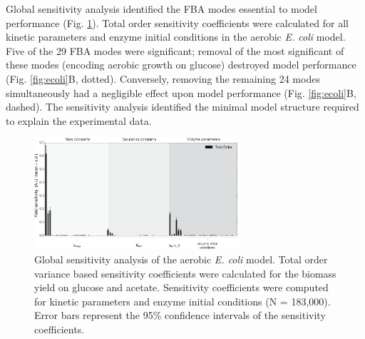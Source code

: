 \documentclass[10pt,twocolumn,twoside,final]{IEEEtran}
\begin{document}
Global sensitivity analysis identified the FBA modes essential to model performance (Fig. \ref{fig:sensitivity}).
Total order sensitivity coefficients were calculated for all kinetic parameters and enzyme initial conditions in the aerobic \textit{E. coli} model.
Five of the 29 FBA modes were significant;
removal of the most significant of these modes (encoding aerobic growth on glucose) destroyed model performance (Fig. \ref{fig:ecoli}B, dotted).
Conversely, removing the remaining 24 modes simultaneously had a negligible effect upon model performance (Fig. \ref{fig:ecoli}B, dashed).
The sensitivity analysis identified the minimal model structure required to explain the experimental data.

\begin{figure}[!t]\centering
\includegraphics[width=0.68\textwidth]{./figs/Fig-3-Sensitivity-Results.pdf}
\caption{Global sensitivity analysis of the aerobic \textit{E. coli} model.
Total order variance based sensitivity coefficients were calculated for the biomass yield on glucose and acetate.
Sensitivity coefficients were computed for kinetic parameters and enzyme initial conditions (N = 183,000).
Error bars represent the 95\% confidence intervals of the sensitivity coefficients.
}
\label{fig:sensitivity}
\end{figure}

\end{document}
